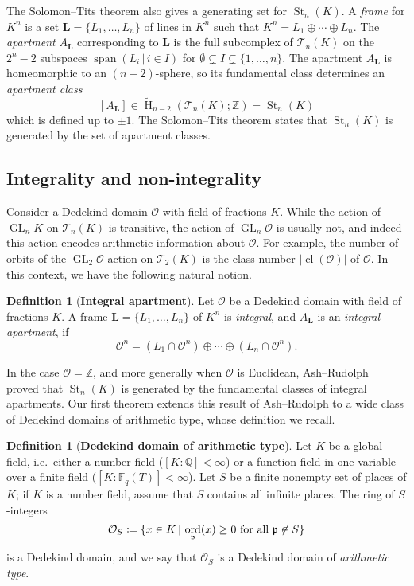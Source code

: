\documentclass[11 pt]{article}
\theoremstyle{plain}
\theoremstyle{definition}
\newtheorem{definition}[theorem]{Definition}
\numberwithin{equation}{section}
\DeclareMathOperator{\GL}{GL}
\newcommand\Z{\ensuremath{\mathbb{Z}}}
\newcommand\Q{\ensuremath{\mathbb{Q}}}
\newcommand\F{\ensuremath{\mathbb{F}}}
\DeclareMathOperator{\HH}{H}
\newcommand{\parasmallskip}[1]{\smallskip\noindent\textbf{#1.}}
\renewcommand{\O}{\mathcal{O}}
\DeclareMathOperator{\class}{cl}
\newcommand\Tits{\ensuremath{\mathcal{T}}}
\newcommand\T{\Tits}
\DeclareMathOperator{\St}{St}
\newcommand\LL{\mathbf{L}}
\newcommand\coloneq{\mathrel{\mathop:}\mkern-1.2mu=}
\newcommand\abs[1]{\left\lvert#1\right\rvert}
\DeclareMathOperator\spn{span}
\DeclareMathOperator\ord{ord}
\begin{document}
The Solomon--Tits theorem also gives a generating set for $\St_n(K)$.
A \emph{frame} for $K^n$ is a  set $\LL = \{L_1,\ldots,L_n\}$ of lines in $K^n$ such that
$K^n = L_1 \oplus \cdots \oplus L_n$.  The \emph{apartment} $A_{\LL}$ corresponding to $\LL$ is the full subcomplex of $\Tits_n(K)$ on the $2^n-2$ subspaces $\spn(L_i \,|\, i \in I)$ for $\emptyset\subsetneq I\subsetneq \{1,\ldots,n\}$.
The apartment $A_{\LL}$ is %
homeomorphic to an $(n-2)$-sphere,  %
so its fundamental class determines an {\em apartment class}
\[[A_{\LL}] \in \widetilde{\HH}_{n-2}(\Tits_n(K);\Z) = \St_n(K)\]
which is defined up to $\pm 1$.  The Solomon--Tits theorem %
states that $\St_n(K)$ is generated by the set
of apartment classes. 

\subsection{Integrality and non-integrality}  
Consider a Dedekind domain $\O$ with field of fractions $K$. While the action of $\GL_n K$ on $\Tits_n(K)$ is transitive, the action of $\GL_n \O$ is usually not, and indeed this action encodes arithmetic information about $\O$.  For example, the number of orbits of the $\GL_2 \O$-action on $\T_2(K)$ is the class number  $\abs{\class(\O)}$ of $\O$. 
In this context, we have the following natural notion.

\begin{definition}[\textbf{Integral apartment}]
\label{def:integral}
Let $\O$ be a Dedekind domain with field of fractions $K$. 
A frame $\LL=\{L_1,\ldots,L_n\}$ of $K^n$ is \emph{integral}, and $A_{\LL}$ is an \emph{integral apartment}, if 
\[\O^n=(L_1\cap \O^n)\oplus \cdots\oplus (L_n\cap \O^n).\]
\end{definition}
In the case $\O=\Z$, and more generally when $\O$ is Euclidean, Ash--Rudolph~\cite[Theorem~4.1]{AshRudolph} proved that $\St_n(K)$ is generated by the fundamental classes of integral apartments.
Our first theorem extends this 
result of Ash--Rudolph to a wide class of Dedekind domains of arithmetic type, whose definition we recall.

\begin{definition}[\textbf{Dedekind domain of arithmetic type}]
 Let $K$ be a global field, i.e.\ either a number field ($[K:\Q]<\infty$) or a function field in one variable over a finite field ($[K:\F_q(T)]<\infty$). Let $S$ be a finite nonempty set of places of $K$; if $K$ is a number field, assume that $S$ contains all infinite 
places. The ring of $S$-integers \[\O_S\coloneq\{x\in K \,|\, \ord_{\mathfrak{p}}(x)\geq 0\text{ for all }\mathfrak{p}\not\in S\}\] is a Dedekind domain, and we say that $\O_S$ is a Dedekind domain of \emph{arithmetic type}.
\end{definition}
\end{document}
